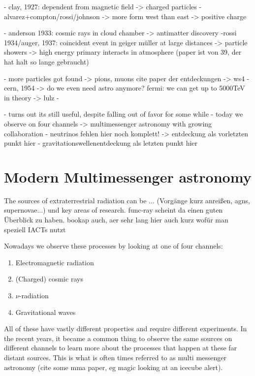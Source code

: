 - clay, 1927: dependent from magnetic field -> charged particles
\cite{clay1927penetrating}
- alvarez+compton/rossi/johnson -> more form west than east -> positive charge
\cite{PhysRev.43.835}
\cite{Rossi1933}
\cite{PhysRev.43.834}

- anderson 1933: cosmic rays in cloud chamber -> antimatter discovery
\cite{PhysRev.43.491}
-rossi 1934/auger, 1937: coincident event in geiger müller at large distances -> particle showers -> high energy primary interacts in atmosphere
\cite{PhysRev.45.212}
\cite{RevModPhys.11.288} (paper ist von 39, der hat halt so lange gebraucht)

- more particles got found -> pions, muons
cite paper der entdeckungen -> ws4
- cern, 1954 -> do we even need astro anymore? fermi: we can get up to 5000TeV in theory -> lulz
-

- turns out its still useful, despite falling out of favor for some while
- today we observe on four channels -> multimessenger astronomy with growing collaboration
- neutrinos fehlen hier noch komplett! -> entdeckung als vorletzten punkt hier
- gravitationswellenentdeckung als letzten punkt hier

\section{Modern Multimessenger astronomy}

The sources of extraterrestrial radiation can be ...
(Vorgänge kurz anreißen, agns, supernovae...)
und key areas of research. func-ray scheint da einen guten Überblick zu haben. bookap auch, aer sehr lang
hier auch kurz wofür man speziell IACTs nutzt

Nowadays we observe these processes by looking at one of four channels: 
\begin{enumerate}
	\item Electromagnetic radiation
	\item (Charged) cosmic rays
	\item $\nu$-radiation
	\item Gravitational waves
\end{enumerate}

All of these have vastly different properties and require different experiments.
In the recent years, it became a common thing to observe the same sources 
on different channels to learn more about the processes that happen at 
these far distant sources. This is what is often times 
referred to as multi messenger astronomy (cite some mma paper, eg magic looking at an icecube alert).

